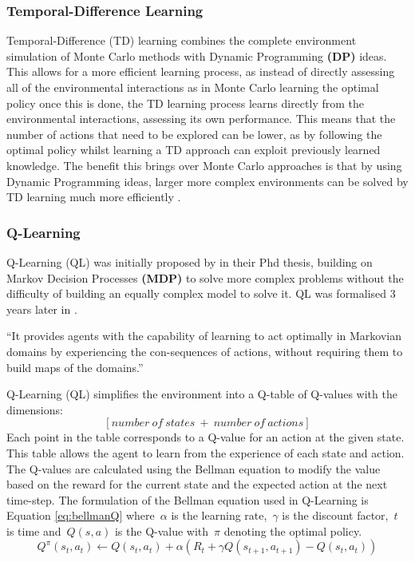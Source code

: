 \documentclass[hidelinks,journal]{IEEEtran}
\begin{document}
\subsubsection{Temporal-Difference Learning}
\label{subsubsec:intBgTdl}
Temporal-Difference (TD) learning combines the complete environment simulation of Monte Carlo methods with Dynamic Programming \textbf{(DP)} ideas. This allows for a more efficient learning process, as instead of directly assessing all of the environmental interactions as in Monte Carlo learning the optimal policy once this is done, the TD learning process learns directly from the environmental interactions, assessing its own performance. This means that the number of actions that need to be explored can be lower, as by following the optimal policy whilst learning a TD approach can exploit previously learned knowledge. The benefit this brings over Monte Carlo approaches is that by using Dynamic Programming ideas, larger more complex environments can be solved by TD learning much more efficiently \parencite{Sutton18}.
\subsubsection{Q-Learning}
\label{subsubsec:intBgQl}
Q-Learning (QL) was initially proposed by \textcite{Watkins89} in their Phd thesis, building on Markov Decision Processes \textbf{(MDP)} to solve more complex problems without the difficulty of building an equally complex model to solve it. QL was formalised 3 years later in \textcite{Watkins92}.

“It provides  agents with the capability of learning to act optimally in Markovian domains by experiencing the con-sequences of actions, without requiring them to build maps of the domains.” \parencite[p. 1]{Watkins92}

Q-Learning (QL) simplifies the environment into a Q-table of Q-values with the dimensions: $$[number \: of \: states \: + \: number \: of \: actions]$$ Each point in the table corresponds to a Q-value for an action at the given state. This table allows the agent to learn from the experience of each state and action. The Q-values are calculated using the Bellman equation to modify the value based on the reward for the current state and the expected action at the next time-step. The formulation of the Bellman equation used in Q-Learning is Equation \ref{eq:bellmanQ} where~$\alpha$ is the learning rate,~$\gamma$ is the discount factor,~$t$ is time and~$Q(s, a)$ is the Q-value with~$\pi$ denoting the optimal policy.
\begin{equation}\label{eq:bellmanQ}
  Q^\pi(s_t, a_t) \leftarrow Q(s_t, a_t) + \alpha (R_t + \gamma Q(s_{t+1}, a_{t+1}) - Q(s_t, a_t))
\end{equation}
\end{document}
